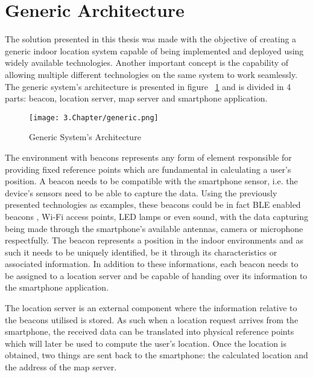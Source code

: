 \section{Generic Architecture} 
\label{sec:generic} 
 
 
The solution presented in this thesis was made with the objective of creating a generic indoor location system capable of being implemented and deployed using widely available technologies. Another important concept is the capability of allowing multiple different technologies on the same system to work seamlessly. The generic system's architecture is presented in figure ~\ref{fig:generic} and is divided in 4 parts: beacon, location server, map server and smartphone application.  
 
 
 
 
\begin{figure}[H] 
\centering 
\texttt{[image: 3.Chapter/generic.png]} 
\caption[Generic System's Architecture]{Generic System's Architecture} 
\label{fig:generic} 
\end{figure} 
 
 
The environment with beacons represents any form of element responsible for providing fixed reference points which are fundamental in calculating a user's position. A beacon needs to be compatible with the smartphone sensor, i.e. the device's sensors need to be able to capture the data. Using the previously presented technologies as examples, these beacons could be in fact BLE enabled beacons , Wi-Fi access points, LED lamps or even sound, with the data capturing being made through the smartphone's available antennas, camera or microphone respectfully. The beacon represents a position in the indoor environments and as such it needs to be uniquely identified, be it through its characteristics or associated information. In addition to these informations, each beacon needs to be assigned to a location server and be capable of handing over its information to the smartphone application.  
 
 
 
 
The location server is an external component where the information relative to the beacons utilised is stored. As such when a location request arrives from the smartphone, the received data can be translated into physical reference points which will later be used to compute the user's location. Once the location is obtained, two things are sent back to the smartphone: the calculated location and the address of the map server. 
 
